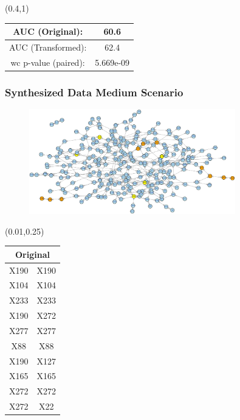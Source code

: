\documentclass{beamer}
\newcommand{\boz}{\cellcolor{pathwaynode}}
\newcommand{\ghool}{\cellcolor{independentnode}}
\begin{document}
\begin{frame}
\begin{textblock*}{\paperwidth}
  \end{textblock*}
  \begin{textblock*}{\paperwidth}(0.4\textwidth,1\textheight)
    \raggedright 
    \tiny
    \begin{tabular}{| c c |}
      \hline
AUC (Original): & 60.6 \\ \hline
AUC (Transformed): & 62.4 \\ \hline
      wc p-value (paired): & 5.669e-09 \\ \hline
    \end{tabular}
    \hspace{.5em}
  \end{textblock*}
\end{frame}

\begin{frame}
  \frametitle{Synthesized Data Medium Scenario}
  \begin{figure}
    \includegraphics[width=0.8\textwidth]{synthesized-medium}
  \end{figure}
  \begin{textblock*}{\paperwidth}(0.01\textwidth,0.25\textheight)
    \raggedright 
    \tiny
    \begin{tabular}{| c c |}
      \hline
\toprule
\multicolumn{2}{c}{Original} \\ 
\midrule \hline
\boz X190   &  \boz X190  \\ \hline
X104   &  X104  \\ \hline
X233   &  X233  \\ \hline
\boz X190   &  \boz X272  \\ \hline
X277   &  X277  \\ \hline
\ghool X88   &  \ghool X88  \\ \hline
\boz X190   &  X127  \\ \hline
X165   &  X165  \\ \hline
\boz X272   &  \boz X272  \\ \hline
\boz X272   &  \boz X22  \\ \hline

\end{tabular}
\end{textblock*}
\end{frame}
\end{document}
